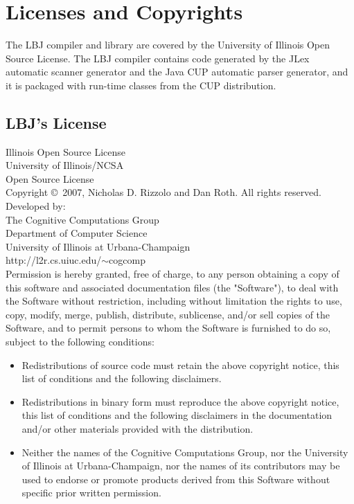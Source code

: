 
\chapter{Licenses and Copyrights}

The LBJ compiler and library are covered by the University of Illinois Open
Source License.  The LBJ compiler contains code generated by the JLex
automatic scanner generator and the Java CUP automatic parser generator, and
it is packaged with run-time classes from the CUP distribution.

\section{LBJ's License}

\noindent
Illinois Open Source License \\
University of Illinois/NCSA \\
Open Source License \\

\noindent
Copyright \copyright~2007, Nicholas D. Rizzolo and Dan Roth.  All rights
reserved. \\

\noindent
Developed by: \\
   The Cognitive Computations Group \\
   Department of Computer Science \\
   University of Illinois at Urbana-Champaign \\
   http://l2r.cs.uiuc.edu/$\sim$cogcomp \\

\noindent
Permission is hereby granted, free of charge, to any person obtaining a copy
of this software and associated documentation files (the "Software"), to deal
with the Software without restriction, including without limitation the rights
to use, copy, modify, merge, publish, distribute, sublicense, and/or sell
copies of the Software, and to permit persons to whom the Software is
furnished to do so, subject to the following conditions:

\begin{itemize}
\item Redistributions of source code must retain the above copyright notice,
      this list of conditions and the following disclaimers.
\item Redistributions in binary form must reproduce the above copyright
      notice, this list of conditions and the following disclaimers in the
      documentation and/or other materials provided with the distribution.
\item Neither the names of the Cognitive Computations Group, nor the
      University of Illinois at Urbana-Champaign, nor the names of its
      contributors may be used to endorse or promote products derived from
      this Software without specific prior written permission.
\end{itemize}

